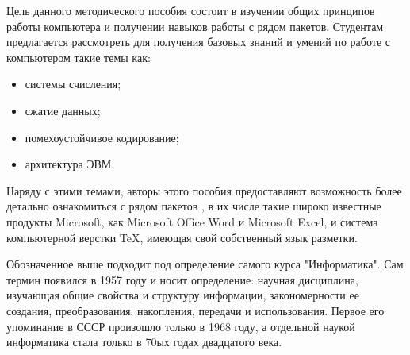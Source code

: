 Цель данного методического пособия состоит в изучении общих принципов работы компьютера и получении навыков работы с рядом пакетов. Студентам предлагается рассмотреть для получения базовых знаний и умений по работе с компьютером такие темы как: 
\begin{itemize}
\item системы счисления;
\item сжатие данных;
\item помехоустойчивое кодирование;
\item архитектура ЭВМ.
\end{itemize}


Наряду с этими темами, авторы этого пособия предоставляют возможность более детально ознакомиться с рядом пакетов
, в их числе такие широко известные продукты Microsoft, как Microsoft Office Word и Microsoft Excel, и система компьютерной верстки TeX, имеющая свой собственный язык разметки.

Обозначенное выше подходит под определение самого курса "Информатика". Сам термин появился в 1957 году и носит определение: научная дисциплина, изучающая общие свойства и структуру информации, закономерности ее создания, преобразования, накопления, передачи и использования. Первое его упоминание в СССР произошло только в 1968 году, а отдельной наукой информатика стала только в 70ых годах двадцатого века. 
